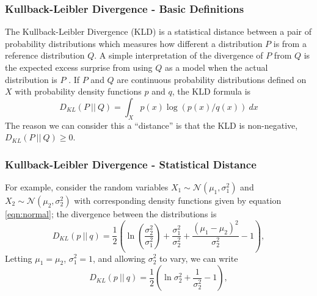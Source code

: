 \documentclass[11pt,aspectratio=169]{beamer}
\newcommand{\parens}[1]{\left(#1\right)}
\begin{document}
    \begin{frame}
        \frametitle{Kullback-Leibler Divergence - Basic Definitions}
        The Kullback-Leibler Divergence (KLD) is a statistical distance between a 
        pair of probability distributions which measures how different a distribution $P$ is 
        from a reference distribution $Q$. A simple interpretation of the 
        divergence of $P$ from $Q$ is the expected excess surprise from using $Q$ as a model 
        when the actual distribution is $P$ \cite{kullback}. If $P$ and $Q$ are continuous probability
        distributions defined on $X$
        with probability density functions $p$ and $q$, the KLD formula 
        is
        \begin{equation}
            D_{KL}(P\ |\!|\ Q) = \int_X p(x)\log\parens{p(x)/q(x)}\ dx \label{eqn:continuous KLD}
        \end{equation}
        The reason we can consider this a ``distance'' is that the KLD 
        is non-negative, $D_{KL}(P\ |\!|\ Q) \geq 0$. 
    \end{frame}

    \begin{frame}
        \frametitle{Kullback-Leibler Divergence - Statistical Distance}
        For example, consider the random variables $X_1 \sim 
        \mathcal{N}(\mu_1, \sigma_1^2)$ and $X_2 \sim \mathcal{N}(\mu_2, \sigma_2^2)$ 
        with corresponding density functions given by equation \ref{eqn:normal}; the divergence 
        between the distributions is
        \begin{equation}
            D_{KL}(p\ |\!|\ q) = \frac{1}{2}\parens{\ln\parens{\frac{\sigma_2^2}{\sigma_1^2}} + 
            \frac{\sigma_1^2}{\sigma_2^2} + \frac{(\mu_1 - \mu_2)^2}{\sigma_2^2} - 1}, \label{eqn:normal divergence}
        \end{equation}
        Letting $\mu_1 = \mu_2$, $\sigma_1^2 = 1$, and allowing $\sigma_2^2$ to vary, we can 
        write 
        \begin{equation}
            D_{KL}(p\ |\!|\ q) = \frac{1}{2}\parens{\ln\sigma_2^2 + 
            \frac{1}{\sigma_2^2} - 1}, \label{eqn:normal divergence2}
        \end{equation}
    \end{frame}
\end{document}
